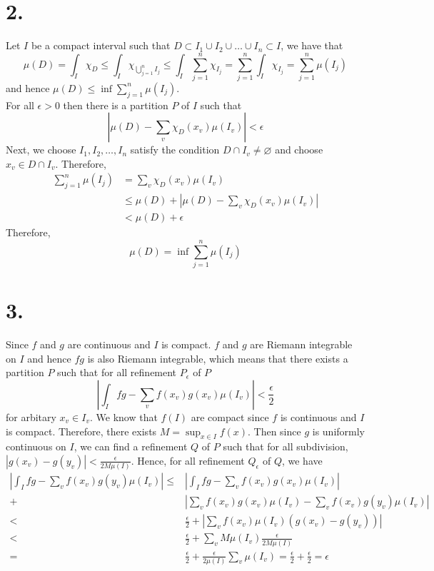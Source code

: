 \documentclass[11pt]{article}
\begin{document}
\section*{2.}
Let $I$ be a compact interval such that  $D \subset I_1 \cup I_2 \cup \ldots \cup I_n \subset I$, we have that 
\[
    \mu(D) = \int_I \chi_D \le \int_I \chi_{\bigcup_{j=1}^n I_j} \le \int_I \sum_{j=1}^n \chi_{I_j} = \sum_{j=1}^n \int_I \chi_{I_j} = \sum_{j=1}^n \mu(I_j)    
\]
and hence $\mu(D) \le \inf \sum_{j=1}^n \mu(I_j)$. \\
For all $\epsilon >0$ then there is a partition $P$ of $I$ such that 
\[
    \left| \mu(D) - \sum_v \chi_D(x_v)\mu(I_v) \right| < \epsilon    
\] 
Next, we choose $I_1, I_2, \ldots, I_n$ satisfy the condition $D \cap I_v \ne \varnothing$ 
and choose $x_v \in D \cap I_v$. 
Therefore, 
\begin{equation*}
    \begin{aligned}
        \sum_{j=1}^n \mu(I_j) &= \sum_v \chi_D(x_v)\mu(I_v) \\
        &\le \mu(D) + \left| \mu(D) - \sum_v \chi_D(x_v) \mu(I_v) \right| \\
        &< \mu(D) + \epsilon     
    \end{aligned}
\end{equation*}
Therefore, 
\[
    \mu(D) = \inf \sum_{j=1}^n \mu(I_j)    
\]
\pagebreak
\section*{3.}
Since $f$ and $g$ are continuous and $I$ is compact. $f$ and $g$ are Riemann integrable on $I$ and 
hence $fg$ is also Riemann integrable, which means that there exists a partition $P$ such that 
for all refinement $P_\epsilon$ of $P$
\[
    \left| \int_I fg - \sum_v f(x_v) g(x_v) \mu(I_v)\right| < \frac{\epsilon}{2} 
\]
for arbitary $x_v \in I_v$. We know that $f(I)$ are compact 
since $f$ is continuous and $I$ is compact. 
Therefore, there exists $M = \sup_{x \in I}f(x)$.
Then since $g$ is uniformly continuous on $I$, we can find a refinement $Q$ of $P$ such that 
for all subdivision, $|g(x_v) - g(y_v)| < \frac{\epsilon}{2 M \mu(I)}$. 
Hence, for all refinement $Q_\epsilon$ of $Q$, we have 
\begin{equation*}
    \begin{aligned}
        \left| \int_I fg - \sum_v f(x_v) g(y_v) \mu(I_v) \right| 
        \le & \left| \int_I fg - \sum_v f(x_v) g(x_v) \mu(I_v) \right| \\
         +& \left| \sum_v f(x_v) g(x_v) \mu(I_v) - \sum_v f(x_v) g(y_v) \mu(I_v) \right| \\
        < & \frac{\epsilon}{2} 
        + \left| \sum_v f(x_v) \mu(I_v) (g(x_v) - g(y_v) )\right| \\
        < & \frac{\epsilon}{2} + \sum_v M \mu(I_v) \frac{\epsilon}{2 M \mu(I)}  \\
        = & \frac{\epsilon}{2} + \frac{\epsilon}{2 \mu(I)} \sum_v \mu(I_v) 
        = \frac{\epsilon}{2} + \frac{\epsilon}{2} = \epsilon
    \end{aligned}
\end{equation*}
\pagebreak
\end{document}

